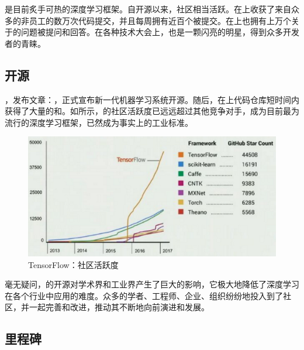 \begin{content}

\tf{}是目前炙手可热的深度学习框架。自开源以来，\tf{}社区相当活跃。在上收获了来自众多的非员工的数万次代码提交，并且每周拥有近百个被提交。在上也拥有上万个关于\tf{}的问题被提问和回答。在各种技术大会上，\tf{}也是一颗闪亮的明星，得到众多开发者的青睐。

\subsection{开源}

，发布文章：，正式宣布新一代机器学习系统开源。随后，在上代码仓库短时间内获得了大量的和。如所示，的社区活跃度已远远超过其他竞争对手，成为目前最为流行的深度学习框架，已然成为事实上的工业标准。

\begin{figure}[H]
\centering
\includegraphics[width=1.0\textwidth]{figures/tf-commits.png}
\caption{TensorFlow：社区活跃度}
 \label{fig:tf-commits}
\end{figure}

毫无疑问，的开源对学术界和工业界产生了巨大的影响，它极大地降低了深度学习在各个行业中应用的难度。众多的学者、工程师、企业、组织纷纷地投入到了社区，并一起完善和改进，推动其不断地向前演进和发展。

\subsection{里程碑}


\end{content}
